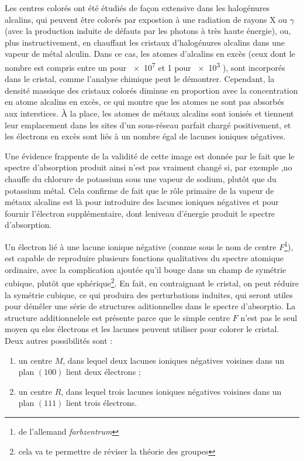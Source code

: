 Les centres colorés ont été étudiés de façon extensive dans les halogénures alcalins, qui peuvent être colorés par expostion à une radiation de rayons X ou $\gamma$ (avec la production induite de défauts par les photons à très haute énergie), ou, plus instructivement, en chauffant les cristaux d'halogénures alcalins dans une vapeur de métal alculin. Dans ce cas, les atomes d'alcalins en excès (ceux dont le nombre est compris entre un pour \SI{e7}{} et 1 pour \SI{e3}{} ), sont incorporés dans le cristal, comme l'analyse chimique peut le démontrer. Cependant, la densité massique des cristaux colorés diminue en proportion avec la concentration en atome alcalins en excès, ce qui montre que les atomes ne sont pas absorbés aux interstices.  À la place, les atomes de métaux alcalins sont ionisés et tiennent leur emplacement dans les sites d'un sous-réseau parfait chargé positivement, et les électrons en excès sont liés à un nombre égal de lacunes ioniques négatives.

Une évidence frappente de la validité de cette image est donnée par le fait que le spectre d'absorption produit ainsi n'est pas vraiment changé si, par exemple ,no chauffe du chlorure de potassium sous une vapeur de sodium, plutôt que du potassium métal. Cela confirme de fait que le rôle primaire de la vapeur de métaux alcalins est là pour introduire des lacunes ioniques négatives et pour fournir l'électron supplémentaire, dont leniveau d'énergie produit le spectre d'absorption.

Un électron lié à une lacune ionique négative (connue sous le nom de centre $F$\footnote{de l'allemand \emph{farbzentrum}}), est capable de reproduire plusieurs fonctions qualitatives du spectre atomique ordinaire, avec la complication ajoutée qu'il bouge dans un champ de symétrie cubique, plutôt que sphérique\footnote{cela va te permettre de réviser la théorie des groupes}. En fait, en contraignant le cristal, on peut réduire la symétrie cubique, ce qui produira des perturbations induites, qui seront utiles pour démêler une série de structures aditionnelles dans le spectre d'absorptio. La structure additionnelele est présente parce que le simple centre $F$ n'est pas le seul moyen qu eles électrons et les lacunes peuvent utiliser pour colorer le cristal. Deux autres possibilités sont :
\begin{enumerate}
    \item un centre $M$, dans lequel deux lacunes ioniques négatives voisines dans un plan $(100)$ lient deux électrons ;
    \item un centre $R$, dans lequel trois lacunes ioniques négatives voisines dans un plan $(111)$ lient trois électrons.
\end{enumerate}

